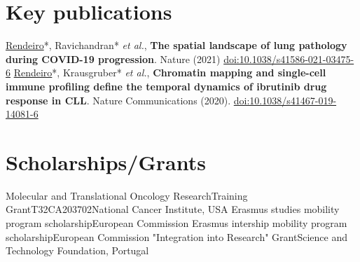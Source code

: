 \documentclass[11pt,a4paper,roman]{moderncv} %
\begin{document}
\section{Key publications}
    \cvitem{}
        {\underline{Rendeiro}*, Ravichandran* \textit{et al.}, \textbf{The spatial landscape of lung pathology during COVID-19 progression}. Nature (2021) \href{https://dx.doi.org/10.1038/s41586-021-03475-6}{doi:10.1038/s41586-021-03475-6}}
    \cvitem{}
        {\underline{Rendeiro}*, Krausgruber* \textit{et al.}, \textbf{Chromatin mapping and single-cell immune profiling define the temporal dynamics of ibrutinib drug response in CLL}. Nature Communications (2020). \href{https://dx.doi.org/10.1038/s41467-019-14081-6}{doi:10.1038/s41467-019-14081-6}}


\section{Scholarships/Grants}
        {Molecular and Translational Oncology Research}{Training Grant}{T32CA203702}{}{National Cancer Institute, USA}
        {Erasmus studies mobility program scholarship}{}{}{}{European Commission}
        {Erasmus intership mobility program scholarship}{}{}{}{European Commission}
        {"Integration into Research" Grant}{}{}{}{Science and Technology Foundation, Portugal}
\end{document}
